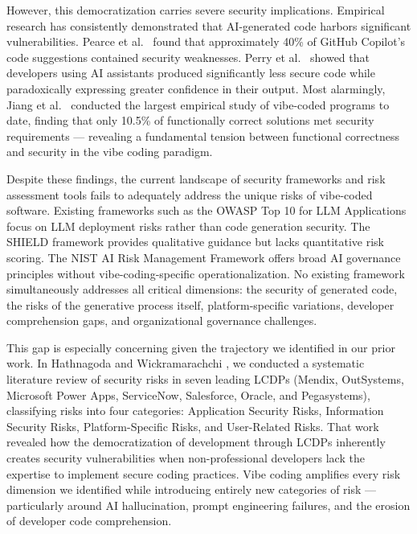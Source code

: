 \documentclass[preprint,review,12pt]{elsarticle}
\begin{document}
However, this democratization carries severe security implications. Empirical research has consistently demonstrated that AI-generated code harbors significant vulnerabilities. Pearce et al.\ \cite{pearce2022asleep} found that approximately 40\% of GitHub Copilot's code suggestions contained security weaknesses. Perry et al.\ \cite{perry2023users} showed that developers using AI assistants produced significantly less secure code while paradoxically expressing greater confidence in their output. Most alarmingly, Jiang et al.\ \cite{jiang2025vibecoding} conducted the largest empirical study of vibe-coded programs to date, finding that only 10.5\% of functionally correct solutions met security requirements --- revealing a fundamental tension between functional correctness and security in the vibe coding paradigm.

Despite these findings, the current landscape of security frameworks and risk assessment tools fails to adequately address the unique risks of vibe-coded software. Existing frameworks such as the OWASP Top 10 for LLM Applications \cite{owasp2025llm} focus on LLM deployment risks rather than code generation security. The SHIELD framework \cite{unit42shield} provides qualitative guidance but lacks quantitative risk scoring. The NIST AI Risk Management Framework \cite{nist2023ai} offers broad AI governance principles without vibe-coding-specific operationalization. No existing framework simultaneously addresses all critical dimensions: the security of generated code, the risks of the generative process itself, platform-specific variations, developer comprehension gaps, and organizational governance challenges.

This gap is especially concerning given the trajectory we identified in our prior work. In Hathnagoda and Wickramarachchi \cite{hathnagoda2024assessing}, we conducted a systematic literature review of security risks in seven leading LCDPs (Mendix, OutSystems, Microsoft Power Apps, ServiceNow, Salesforce, Oracle, and Pegasystems), classifying risks into four categories: Application Security Risks, Information Security Risks, Platform-Specific Risks, and User-Related Risks. That work revealed how the democratization of development through LCDPs inherently creates security vulnerabilities when non-professional developers lack the expertise to implement secure coding practices. Vibe coding amplifies every risk dimension we identified while introducing entirely new categories of risk --- particularly around AI hallucination, prompt engineering failures, and the erosion of developer code comprehension.
\end{document}
